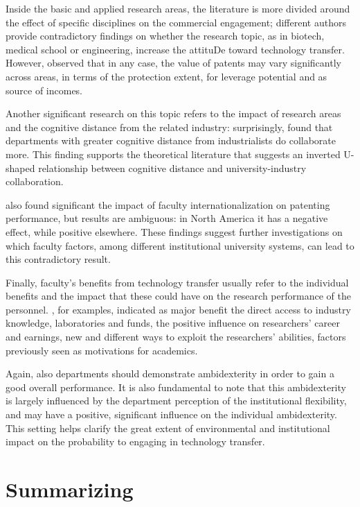 Inside the basic and applied research areas, the literature is more divided around the effect of specific disciplines on the commercial engagement; different authors provide contradictory findings on whether the research topic, as in biotech, medical school or engineering, increase the attituDe toward technology transfer. However, \citet{OwenSmith2001} observed that in any case, the value of patents may vary significantly across areas, in terms of the protection extent, for leverage potential and as source of incomes. 

Another significant research on this topic refers to the impact of research areas and the cognitive distance from the related industry: surprisingly, \citet{Muscio2010} found that departments with greater cognitive distance from industrialists do collaborate more. This finding supports the theoretical literature that suggests an inverted U-shaped relationship between cognitive distance and university-industry collaboration.

\citet{Wong2010} also found significant the impact of faculty internationalization on patenting performance, but results are ambiguous: in North America it has a negative effect, while positive elsewhere. These findings suggest further investigations on which faculty factors, among different institutional university systems, can lead to this contradictory result. 

Finally, faculty's benefits from technology transfer usually refer to the individual benefits and the impact that these could have on the research performance of the personnel. \citet{Baldini2007}, for examples, indicated as major benefit the direct access to industry knowledge, laboratories and funds, the positive influence on researchers' career and earnings, new and different ways to exploit the researchers' abilities, factors previously seen as motivations for academics.

Again, also departments should demonstrate ambidexterity in order to gain a good overall performance. It is also fundamental to note that this ambidexterity is largely influenced by the department perception of the institutional flexibility, and may have a positive, significant influence on the individual ambidexterity. This setting helps clarify the great extent of environmental and institutional impact on the probability to engaging in technology transfer.

\section{Summarizing}